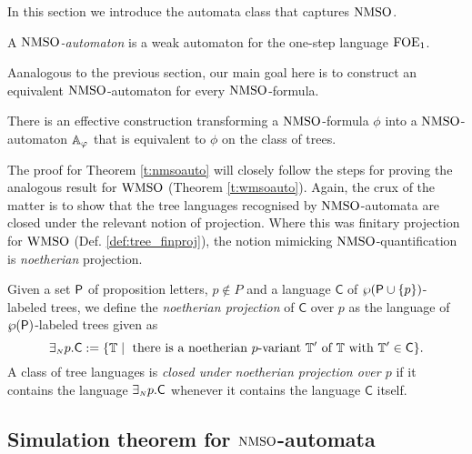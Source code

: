 
In this section we introduce the automata class that captures $\mathrm{NMSO}$.

\begin{definition}
A \emph{$\mathrm{NMSO}$-automaton} is a weak automaton for the one-step language $\mathrm{FOE}_1$.
\end{definition}

Aanalogous to the previous section, our main goal here is to construct an
equivalent $\mathrm{NMSO}$-automaton for every $\mathrm{NMSO}$-formula.

\begin{theorem}
\label{t:nmsoauto}
There is an effective construction transforming a $\mathrm{NMSO}$-formula $\phi$
into a $\mathrm{NMSO}$-automaton $\mathbb{A}_{\varphi}$ that is equivalent
to $\phi$ on the class of trees.
\end{theorem}

The proof for Theorem \ref{t:nmsoauto} will closely follow the steps for proving
the analogous result for $\mathrm{WMSO}$ (Theorem \ref{t:wmsoauto}).
Again, the crux of the matter is to show that the tree languages recognised by
$\mathrm{NMSO}$-automata are closed under the relevant notion of projection.
Where this was finitary projection for $\mathrm{WMSO}$ (Def. \ref{def:tree_finproj}),
the notion mimicking $\mathrm{NMSO}$-quantification is \emph{noetherian} projection.

\begin{definition}\label{def:tree_finproj}
Given a set $\mathsf{P}$ of proposition letters, $p \not\in P$ and a language 
$\mathsf{C}$ of $\wp (\mathsf{P}\cup\{p\})$-labeled trees, we define the 
\emph{noetherian projection} of $\mathsf{C}$ over $p$ as the language of $\wp
(\mathsf{P})$-labeled trees given as 
$$
\noetexists p.\mathsf{C} \df \{\bbT \mid 
   \text{ there is a noetherian $p$-variant } \bbT' \text{ of } \bbT 
   \text{ with } \bbT' \in \mathsf{C}\}.
$$
A class of tree languages is \emph{closed under noetherian projection over $p$} 
if it contains the language ${{\exists_{{\scriptscriptstyle N}}} p}.\mathsf{C}$ whenever it contains 
the language $\mathsf{C}$ itself.
\end{definition}

\subsection{Simulation theorem for $\mathrm{NMSO}$-automata}\label{sec:simulation_nmso}


